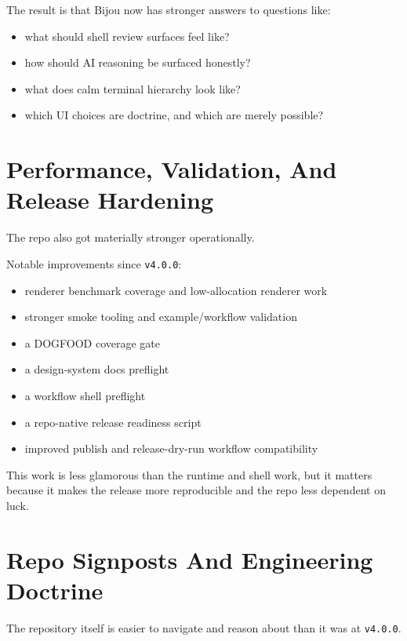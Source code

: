 The result is that Bijou now has stronger answers to questions like:

\begin{itemize}
\tightlist
\item
  what should shell review surfaces feel like?
\item
  how should AI reasoning be surfaced honestly?
\item
  what does calm terminal hierarchy look like?
\item
  which UI choices are doctrine, and which are merely possible?
\end{itemize}

\section{Performance, Validation, And Release Hardening}\label{record-275-performance-validation-and-release-hardening}

The repo also got materially stronger operationally.

Notable improvements since \texttt{v\allowbreak{}4\allowbreak{}.\allowbreak{}0\allowbreak{}.\allowbreak{}0}:

\begin{itemize}
\tightlist
\item
  renderer benchmark coverage and low-allocation renderer work
\item
  stronger smoke tooling and example/workflow validation
\item
  a DOGFOOD coverage gate
\item
  a design-system docs preflight
\item
  a workflow shell preflight
\item
  a repo-native release readiness script
\item
  improved publish and release-dry-run workflow compatibility
\end{itemize}

This work is less glamorous than the runtime and shell work, but it matters because it makes the release more reproducible and the repo less dependent on luck.

\section{Repo Signposts And Engineering Doctrine}\label{record-275-repo-signposts-and-engineering-doctrine}

The repository itself is easier to navigate and reason about than it was at \texttt{v\allowbreak{}4\allowbreak{}.\allowbreak{}0\allowbreak{}.\allowbreak{}0}.

